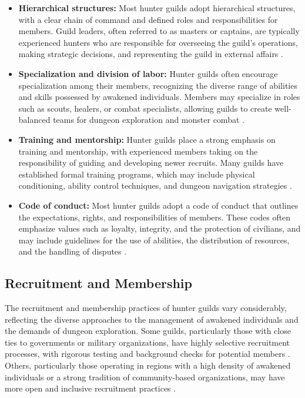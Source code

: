 \documentclass[12pt]{article}
\begin{document}
\begin{itemize}
\item \textbf{Hierarchical structures:} Most hunter guilds adopt hierarchical structures, with a clear chain of command and defined roles and responsibilities for members. Guild leaders, often referred to as masters or captains, are typically experienced hunters who are responsible for overseeing the guild's operations, making strategic decisions, and representing the guild in external affairs \cite{Nakano2026}.

\item \textbf{Specialization and division of labor:} Hunter guilds often encourage specialization among their members, recognizing the diverse range of abilities and skills possessed by awakened individuals. Members may specialize in roles such as scouts, healers, or combat specialists, allowing guilds to create well-balanced teams for dungeon exploration and monster combat \cite{Lee2027}.

\item \textbf{Training and mentorship:} Hunter guilds place a strong emphasis on training and mentorship, with experienced members taking on the responsibility of guiding and developing newer recruits. Many guilds have established formal training programs, which may include physical conditioning, ability control techniques, and dungeon navigation strategies \cite{Nowak2027}.

\item \textbf{Code of conduct:} Most hunter guilds adopt a code of conduct that outlines the expectations, rights, and responsibilities of members. These codes often emphasize values such as loyalty, integrity, and the protection of civilians, and may include guidelines for the use of abilities, the distribution of resources, and the handling of disputes \cite{Hofstede2027}.
\end{itemize}

\subsection{Recruitment and Membership}
The recruitment and membership practices of hunter guilds vary considerably, reflecting the diverse approaches to the management of awakened individuals and the demands of dungeon exploration. Some guilds, particularly those with close ties to governments or military organizations, have highly selective recruitment processes, with rigorous testing and background checks for potential members \cite{Branson2027}. Others, particularly those operating in regions with a high density of awakened individuals or a strong tradition of community-based organizations, may have more open and inclusive recruitment practices \cite{Seo2027}.
\end{document}
